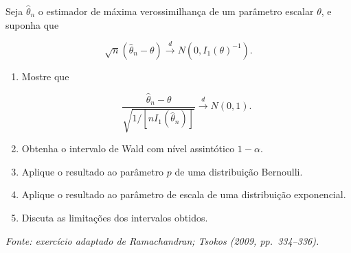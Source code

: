 \documentclass[
  letterpaper,
  DIV=11,
  numbers=noendperiod]{scrreprt}
\begin{document}
\begin{tcolorbox}[enhanced jigsaw, colback=white, leftrule=.75mm, colbacktitle=quarto-callout-tip-color!10!white, breakable, titlerule=0mm, bottomtitle=1mm, title=\textcolor{quarto-callout-tip-color}{\faLightbulb}\hspace{0.5em}{Exercício 9 --- Intervalos assintóticos}, colframe=quarto-callout-tip-color-frame, toprule=.15mm, opacityback=0, bottomrule=.15mm, opacitybacktitle=0.6, arc=.35mm, toptitle=1mm, rightrule=.15mm, coltitle=black, left=2mm]

Seja \(\widehat\theta_n\) o estimador de máxima verossimilhança de um
parâmetro escalar \(\theta\), e suponha que

\[\sqrt n
(\widehat\theta_n-\theta)
\xrightarrow{d}
N
\left(
0,
I_1(\theta)^{-1}
\right).\]

\begin{enumerate}
\def\labelenumi{\arabic{enumi}.}
\item
  Mostre que

  \[\frac{
  \widehat\theta_n-\theta
  }{
  \sqrt{
  1/[nI_1(\widehat\theta_n)]
  }
  }
  \xrightarrow{d}
  N(0,1).\]
\item
  Obtenha o intervalo de Wald com nível assintótico \(1-\alpha\).
\item
  Aplique o resultado ao parâmetro \(p\) de uma distribuição Bernoulli.
\item
  Aplique o resultado ao parâmetro de escala de uma distribuição
  exponencial.
\item
  Discuta as limitações dos intervalos obtidos.
\end{enumerate}

\emph{Fonte: exercício adaptado de Ramachandran; Tsokos (2009,
pp.~334--336).}

\end{tcolorbox}
\end{document}
